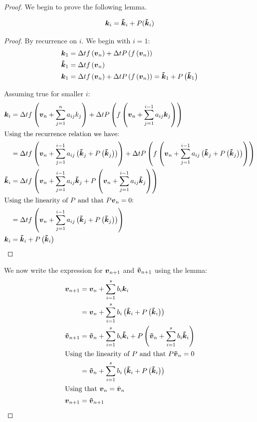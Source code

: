 \begin{proof}
We begin to prove the following lemma.
\begin{lemma}
\begin{equation}
  {\boldsymbol {k}}_{i}={\boldsymbol {\tilde{k}}}_{i}+P({\boldsymbol {\tilde{k}}}_{i})
\end{equation}
\end{lemma}
\begin{proof}
By recurrence on $i$.
We begin with $i=1$:
\begin{align}
  {\boldsymbol {k}}_{1}&=\Delta tf\left({\boldsymbol {v}}_n\right)+\Delta tP\left(f\left({\boldsymbol {v}}_n\right)\right)\\
{\boldsymbol {\tilde{k}}}_{1}&=\Delta tf\left({\boldsymbol {v}}_n\right)\\
  {\boldsymbol {k}}_{1}&=\Delta t f\left({\boldsymbol {v}}_n\right)+\Delta tP\left(f\left({\boldsymbol {v}}_n\right)\right)={\boldsymbol {\tilde{k}}}_1+P\left({\boldsymbol {\tilde{k}}}_1\right)
\end{align}

Assuming true for smaller $i$:
\begin{align*}
  {\boldsymbol {k}}_{i}&=\Delta tf\left({\boldsymbol {v}}_n+\sum_{j=1}^{n}a_{ij}k_{j}\right)+\Delta tP\left(f\left({\boldsymbol {v}}_n+\sum_{j=1}^{i-1}a_{ij}{\boldsymbol {k}}_{j}\right)\right)\\
  \intertext{Using the recurrence relation we have:}
  &=\Delta tf\left({\boldsymbol {v}}_n+\sum_{j=1}^{i-1}a_{ij}\left({\boldsymbol {\tilde{k}}}_{j}+P\left({\boldsymbol {\tilde{k}}}_{j}\right)\right)\right)+\Delta tP\left(f\left({\boldsymbol {v}}_n+\sum_{j=1}^{i-1}a_{ij}\left({\boldsymbol {\tilde{k}}}_{j}+P\left({\boldsymbol {\tilde{k}}}_{j}\right)\right)\right)\right)\\
  {\boldsymbol {\tilde{k}}}_{i}&=\Delta tf\left({\boldsymbol {v}}_n+\sum_{j=1}^{i-1}a_{ij}{\boldsymbol {\tilde{k}}}_{j}+P\left({\boldsymbol {v}}_n+\sum_{j=1}^{i-1}a_{ij}{\boldsymbol {\tilde{k}}}_{j}\right)\right)\\
  \intertext{Using the linearity of $P$ and that $P{\boldsymbol {v}}_{n}=0$:}
  &=\Delta tf\left({\boldsymbol {v}}_n+\sum_{j=1}^{i-1}a_{ij}\left({\boldsymbol {\tilde{k}}}_{j}+P\left({\boldsymbol {\tilde{k}}}_{j}\right)\right)\right)\\
  {\boldsymbol {k}}_{i}&={\boldsymbol {\tilde{k}}}_{i}+P\left({\boldsymbol {\tilde{k}}}_{i}\right)
\end{align*}
\end{proof}

We now write the expression for ${\boldsymbol {v}}_{n+1}$ and ${\boldsymbol {\tilde{v}}}_{n+1}$ using the lemma:
\begin{align*}
{\boldsymbol {v}}_{n+1}&={\boldsymbol {v}}_{n}+\sum_{i=1}^{s}b_{i}{\boldsymbol {k}}_{i}\\
&={\boldsymbol {v}}_{n}+\sum_{i=1}^{s}b_{i}\left({\boldsymbol {\tilde{k}}}_{i}+P\left({\boldsymbol {\tilde{k}}}_{i}\right)\right)\\
{\boldsymbol {\tilde{v}}}_{n+1}&={\boldsymbol {\tilde{v}}}_{n}+\sum_{i=1}^{s}b_{i}{\boldsymbol {\tilde{k}}}_{i}+P\left({\boldsymbol {\tilde{v}}}_{n}+\sum_{i=1}^{s}b_{i}{\boldsymbol {\tilde{k}}}_{i}\right)\\
\intertext{Using the linearity of $P$ and that $P{\boldsymbol {\tilde{v}}}_{n}=0$}
&={\boldsymbol {\tilde{v}}}_{n}+\sum_{i=1}^{s}b_{i}\left({\boldsymbol {\tilde{k}}}_{i}+P\left({\boldsymbol {\tilde{k}}}_{i}\right)\right)\\
\intertext{Using that ${\boldsymbol {v}}_{n}=\tilde{{\boldsymbol {v}}}_{n}$}
{\boldsymbol {v}}_{n+1}&={\boldsymbol {\tilde{v}}}_{n+1}
\end{align*}


\end{proof}
